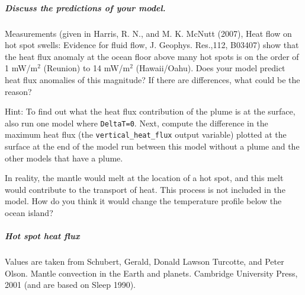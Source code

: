 \subparagraph{Discuss the predictions of your model.}

Measurements (given in Harris, R. N., and M. K. McNutt (2007), Heat flow on hot spot swells: Evidence for fluid flow, J. Geophys. Res.,112, B03407) show that the heat flux anomaly at the ocean floor above many hot spots is on the order of 1 mW/m$^2$ (Reunion) to 14 mW/m$^2$ (Hawaii/Oahu). Does your model predict heat flux anomalies of this magnitude? If there are differences, what could be the reason?

Hint: To find out what the heat flux contribution of the plume is at the surface, also run one model where \texttt{DeltaT=0}. Next, compute the difference in the maximum heat flux (the \texttt{vertical\_heat\_flux} output variable) plotted at the surface at the end of the model run between this model without a plume and the other models that have a plume. 

In reality, the mantle would melt at the location of a hot spot, and this melt would contribute to the transport of heat. This process is not included in the model. How do you think it would change the temperature profile below the ocean island?

\subparagraph{Hot spot heat flux}
\label{sec:heat-flux-table}

Values are taken from Schubert, Gerald, Donald Lawson Turcotte, and Peter Olson. Mantle convection in the Earth and planets. Cambridge University Press, 2001 (and are based on Sleep 1990).

